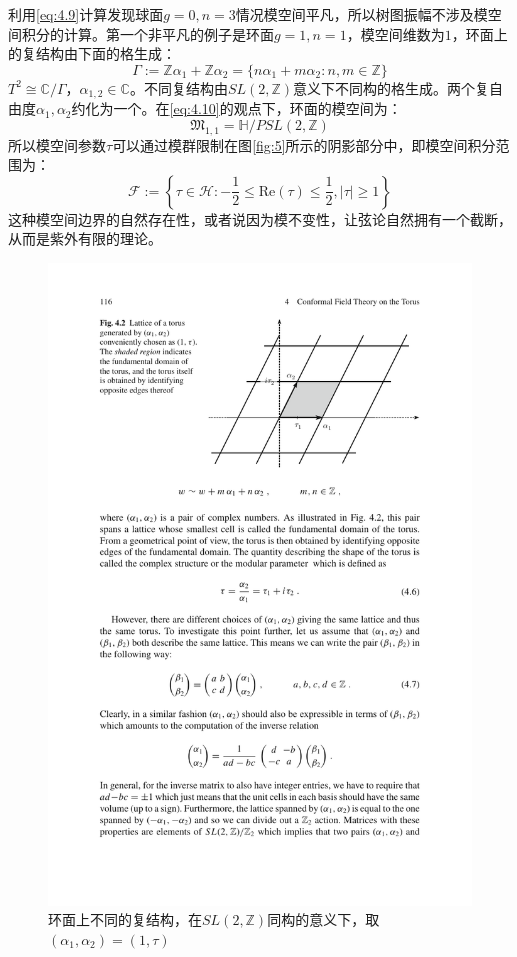 利用\ref{eq:4.9}计算发现球面$g=0,n=3$情况模空间平凡，所以树图振幅不涉及模空间积分的计算。第一个非平凡的例子是环面$g=1,n=1$，模空间维数为$1$，环面上的复结构由下面的格生成：
\begin{equation}
	\Gamma:=\mathbb{Z}\alpha_1+\mathbb{Z}\alpha_2=\{n\alpha_1+m\alpha_2:n,m\in\mathbb{Z}\}
\end{equation}
$T^2 \cong  \mathbb{C}/\Gamma$，$\alpha_{1,2}\in\mathbb{C}$。不同复结构由$SL(2,\mathbb{Z})$意义下不同构的格生成。两个复自由度$\alpha_1,\alpha_2$约化为一个。在\ref{eq:4.10}的观点下，环面的模空间为：
\begin{equation}
	\mathfrak{M}_{1,1}=\mathbb{H}/PSL(2,\mathbb{Z})
\end{equation}
所以模空间参数$\tau$可以通过模群限制在图\ref{fig:5}所示的阴影部分中，即模空间积分范围为：
\begin{equation}
	\mathscr{F}:=\left\{\tau\in\mathscr{H}:-\frac{1}{2}\leq\mathrm{Re}(\tau)\leq\frac{1}{2},|\tau|\geq1\right\}
\end{equation}
这种模空间边界的自然存在性，或者说因为模不变性，让弦论自然拥有一个截断，从而是紫外有限的理论。\cite{Witten:2015mec}
\begin{figure}[htbp]
	\centering
	\includegraphics{figs/fig4.pdf}
	\caption{环面上不同的复结构，在$SL(2,\mathbb{Z})$同构的意义下，取$(\alpha_1,\alpha_2)=(1,\tau)$}
	\label{fig:4}
\end{figure}
